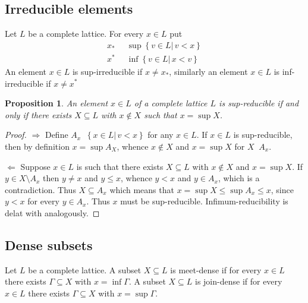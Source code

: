 \documentclass[a4paper]{article}
\newcommand{\obj}[1]{{\left\{ #1 \right \}}}
\newcommand{\induc}[1]{{\left . #1 \right \vert}}
\newtheorem{prop}{Proposition}
\newcommand{\defn}{\mathop{\overset{\Delta}{=}}\nolimits}
\begin{document}

\subsection{Irreducible elements} %
\label{sub:irreducible_elements}
Let $L$ be a complete lattice. For every $x\in L$ put \begin{align*}
	x_* &\defn \sup\obj{\induc{v\in L}\,v < x}\\
	x^* &\defn \inf\obj{\induc{v\in L}\,x < v}
\end{align*} An element $x\in L$ is sup-irreducible if $x\neq x_*$, similarly an element $x\in L$ is inf-irreducible if $x\neq x^*$

\begin{prop} An element $x\in L$ of a complete lattice $L$ is sup-reducible if and only if there exists $X\subseteq L$ with $x\notin X$ such that $x=\sup X$.
\end{prop}

\begin{proof}
$\Rightarrow$ Define $A_x\defn \obj{\induc{x\in L}\,v<x}$ for any $x\in L$. If $x\in L$ is sup-reducible, then by definition $x = \sup A_X$, whence $x\notin X$ and $x=\sup X$ for $X \defn A_x$.

$\Leftarrow$ Suppose $x\in L$ is such that there exists $X\subseteq L$ with $x\notin X$ and $x = \sup X$. If $y\in X\setminus A_x$ then $y\neq x$ and $y\leq x$, whence $y<x$ and $y\in A_x$, which is a contradiction. Thus $X\subseteq A_x$ which means that $x=\sup X \leq \sup A_x \leq x$, since $y<x$ for every $y\in A_x$. Thus $x$ must be sup-reducible. Infimum-reducibility is delat with analogously.
\end{proof}


\subsection{Dense subsets} %
\label{sub:dense_subsets}

Let $L$ be a complete lattice. A subset $X\subseteq L$ is meet-dense if for every $x\in L$ there exists $\Gamma \subseteq X$ with $x = \inf \Gamma$. A subset $X\subseteq L$ is join-dense if for every $x\in L$ there exists $\Gamma \subseteq X$ with $x = \sup \Gamma$.
\end{document}
